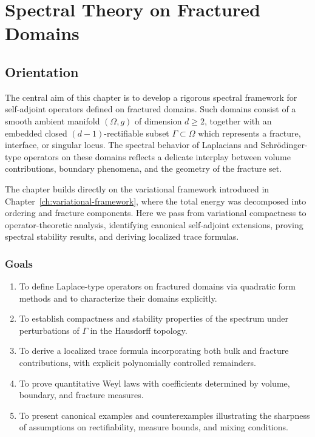\chapter{Spectral Theory on Fractured Domains}
\label{ch:spectral-theory}

\section*{Orientation}
The central aim of this chapter is to develop a rigorous spectral framework for
self-adjoint operators defined on fractured domains. Such domains consist of
a smooth ambient manifold $(\Omega,g)$ of dimension $d \geq 2$, together with
an embedded closed $(d-1)$-rectifiable subset $\Gamma \subset \Omega$ which
represents a fracture, interface, or singular locus. The spectral behavior of
Laplacians and Schrödinger-type operators on these domains reflects a delicate
interplay between volume contributions, boundary phenomena, and the geometry of
the fracture set.

The chapter builds directly on the variational framework introduced in
Chapter~\ref{ch:variational-framework}, where the total energy was decomposed
into ordering and fracture components. Here we pass from variational
compactness to operator-theoretic analysis, identifying canonical
self-adjoint extensions, proving spectral stability results, and deriving
localized trace formulas.

\subsection*{Goals}
\begin{enumerate}[label=G\arabic*., leftmargin=12mm]
  \item To define Laplace-type operators on fractured domains via quadratic
        form methods and to characterize their domains explicitly.
  \item To establish compactness and stability properties of the spectrum
        under perturbations of $\Gamma$ in the Hausdorff topology.
  \item To derive a localized trace formula incorporating both bulk and
        fracture contributions, with explicit polynomially controlled remainders.
  \item To prove quantitative Weyl laws with coefficients determined by
        volume, boundary, and fracture measures.
  \item To present canonical examples and counterexamples illustrating the
        sharpness of assumptions on rectifiability, measure bounds, and
        mixing conditions.
\end{enumerate}


